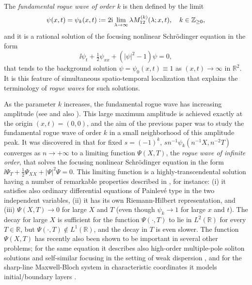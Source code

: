 The \emph{fundamental rogue wave of order $k$} is then defined by the limit 
\begin{equation}
\psi(x,t)=\psi_k(x,t)\vcentcolon= 2\mathrm{i}\lim_{\lambda\to\infty}\lambda M_{12}^{(k)}(\lambda;x,t), \quad k\in\mathbb{Z}_{\ge 0},
\label{eq:psi-from-M}
\end{equation}
and it is a rational solution of the focusing nonlinear Schr\"odinger equation in the form 
\begin{equation}
\ii\psi_t +\tfrac{1}{2}\psi_{xx}+(|\psi|^2-1)\psi=0,
\label{eq:NLS}
\end{equation}
that tends to the background solution $\psi=\psi_0(x,t)\equiv 1$ as $(x,t)\to\infty$ in $\mathbb{R}^2$.  It is this feature of simultaneous spatio-temporal localization that explains the terminology of \emph{rogue waves} for such solutions.  

As the parameter $k$ increases, the fundamental rogue wave has increasing amplitude (see \cite[Proposition 2]{BilmanLM20} and also \cite{AAS09, WangYWH17}).  This large maximum amplitude is achieved exactly at the origin $(x,t)=(0,0)$, and the aim of the previous paper \cite{BilmanLM20} was to study the fundamental rogue wave of order $k$ in a small neighborhood of this amplitude peak.  It was discovered in \cite{BilmanLM20} that for fixed $s=(-1)^k$, $sn^{-1}\psi_k(n^{-1}X,n^{-2}T)$ converges as $n\to+\infty$ to a limiting function $\Psi(X,T)$, the \emph{rogue wave of infinite order}, that solves the focusing nonlinear Schr\"odinger equation in the form $\ii\Psi_T+\tfrac{1}{2}\Psi_{XX}+|\Psi|^2\Psi=0$.  This limiting function is a highly-transcendental solution having a number of remarkable properties described in \cite{BilmanLM20}, for instance:  (i) it satisfies also ordinary differential equations of Painlev\'e type in the two independent variables, (ii) it has its own Riemann-Hilbert representation, and (iii) $\Psi(X,T)\to 0$ for large $X$ and $T$ (even though $\psi_k\to 1$ for large $x$ and $t$).  The decay for large $X$ is sufficient for the function $\Psi(\cdot,T)$ to lie in $L^2(\mathbb{R})$ for every $T\in\mathbb{R}$, but $\Psi(\cdot,T)\not\in L^1(\mathbb{R})$, and the decay in $T$ is even slower.    The function $\Psi(X,T)$ has recently also been shown to be important in several other problems; for the same equation it describes also high-order multiple-pole soliton solutions \cite{BilmanB19} and self-similar focusing in the setting of weak dispersion \cite{Suleimanov17,BuckinghamJM21}, and for the sharp-line Maxwell-Bloch system in characteristic coordinates it models initial/boundary layers \cite{LiM21}.

